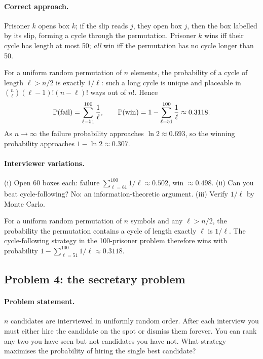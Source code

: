 \paragraph{Correct approach.}
Prisoner $k$ opens box $k$; if the slip reads $j$, they open box
$j$, then the box labelled by its slip, forming a cycle through
the permutation.  Prisoner $k$ wins iff their cycle has length at
most 50; \emph{all} win iff the permutation has no cycle longer
than 50.

For a uniform random permutation of $n$ elements, the probability
of a cycle of length $\ell > n/2$ is exactly $1/\ell$: such a long
cycle is unique and placeable in $\binom{n}{\ell}(\ell-1)!(n-\ell)!$
ways out of $n!$.  Hence
\[
\mathbb{P}(\text{fail})
= \sum_{\ell=51}^{100} \frac{1}{\ell},
\qquad
\mathbb{P}(\text{win})
= 1 - \sum_{\ell=51}^{100} \frac{1}{\ell}
\approx 0.3118.
\]
As $n \to \infty$ the failure probability approaches
$\ln 2 \approx 0.693$, so the winning probability approaches
$1 - \ln 2 \approx 0.307$.

\paragraph{Interviewer variations.}
(i) Open 60 boxes each: failure $\sum_{\ell=61}^{100} 1/\ell
\approx 0.502$, win $\approx 0.498$.  (ii) Can you beat
cycle-following?  No: an information-theoretic argument.  (iii)
Verify $1/\ell$ by Monte Carlo.

\begin{keyfactbox}
For a uniform random permutation of $n$ symbols and any
$\ell > n/2$, the probability the permutation contains a cycle of
length exactly $\ell$ is $1/\ell$.  The cycle-following
strategy in the 100-prisoner problem therefore wins with probability
$1 - \sum_{\ell=51}^{100} 1/\ell \approx 0.3118$.
\end{keyfactbox}

\subsection{Problem 4: the secretary problem}
\label{sec:secretary}

\paragraph{Problem statement.}
$n$ candidates are interviewed in uniformly random order.  After
each interview you must either hire the candidate on the spot or
dismiss them forever.  You can rank any two you have seen but not
candidates you have not.  What strategy maximises the probability
of hiring the single best candidate?

